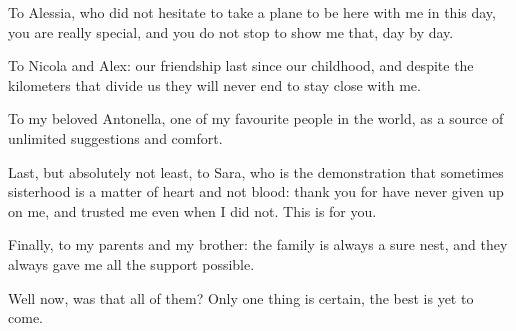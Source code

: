 To Alessia, who did not hesitate to take a plane to be here with me in this day, you are really special, and you do not stop to show me that, day by day. 

To Nicola and Alex: our friendship last since our childhood, and despite the kilometers that divide us they will never end to stay close with me. 

To my beloved Antonella, one of my favourite people in the world, as a source of unlimited suggestions and comfort.

Last, but absolutely not least, to Sara, who is the demonstration that sometimes sisterhood is a matter of heart and not blood: thank you for have never given up on me, and trusted me even when I did not. 
This is for you. 

Finally, to my parents and my brother: the family is always a sure nest, and they always gave me all the support possible. 

Well now, was that all of them? 
Only one thing is certain, the best is yet to come.


